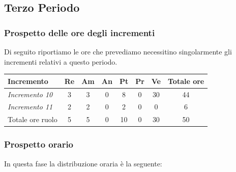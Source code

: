 {{{{{{{{{{{{\subsection{Terzo Periodo}\label{PreventivoFaseDiProgettazioneDiDettaglioECodificaPeriodo3}

\subsubsection{Prospetto delle ore degli incrementi}\label{PreventivoFaseDiProgettazioneDiDettaglioECodificaPeriodo3Incrementi}
Di seguito riportiamo le ore che prevediamo necessitino singolarmente gli incrementi relativi a questo periodo.
\quad
\def\tabularxcolumn#1{m{#1}}
{
	
	\begin{center}
		\renewcommand{\arraystretch}{1.4}
		\begin{tabularx}{\textwidth}{|X|c|c|c|c|c|c|c|}
			\hline
			\rowcolor{airforceblue}
			\textbf{Incremento} & \textbf{Re} & \textbf{Am} & \textbf{An} & \textbf{Pt} & \textbf{Pr} & \textbf{Ve} & \textbf{Totale ore}\\
			\hline
			\textit{Incremento 10} & 3 & 3 & 0 & 8 & 0 & 30 & 44\\
			\hline
			\textit{Incremento 11} & 2 & 2 & 0 & 2 & 0 & 0 & 6\\
			\hline
			Totale ore ruolo & 5 & 5 & 0 & 10 & 0 & 30 & 50\\
			\hline
		\end{tabularx}
	\end{center}
	
	\subsubsection{Prospetto orario}\label{PreventivoFaseDiProgettazioneDiDettaglioECodificaProspettoOrarioPeriodo3}
	In questa fase la distribuzione oraria è la seguente:
	\quad
	\def\tabularxcolumn#1{m{#1}}
	{
		
}}}}}}}}}}}}}}
